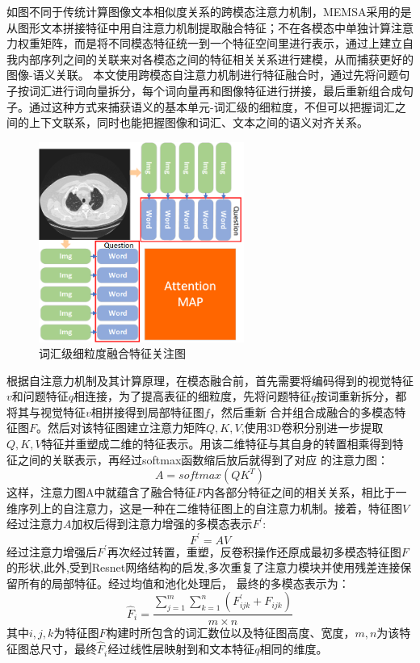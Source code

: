 如图不同于传统计算图像文本相似度关系的跨模态注意力机制，MEMSA采用的是从图形文本拼接特征中用自注意力机制提取融合特征；不在各模态中单独计算注意力权重矩阵，而是将不同模态特征统一到一个特征空间里进行表示，通过上建立自我内部序列之间的关联来对各模态之间的特征相关关系进行建模，从而捕获更好的图像-语义关联。
本文使用跨模态自注意力机制进行特征融合时，通过先将问题句子按词汇进行词向量拆分，每个词向量再和图像特征进行拼接，最后重新组合成句子。通过这种方式来捕获语义的基本单元-词汇级的细粒度，不但可以把握词汇之间的上下文联系，同时也能把握图像和词汇、文本之间的语义对齐关系。
\begin{figure}[htbp]
	\centering	
	\includegraphics[width=0.6\textwidth]{Fig/myfig/chapter3/attention_map.png}  %
	\caption{\label{attention_map}词汇级细粒度融合特征关注图} 
\end{figure}

根据自注意力机制及其计算原理，在模态融合前，首先需要将编码得到的视觉特征$v$和问题特征$q$相连接，为了提高表征的细粒度，先将问题特征$q$按词重新拆分，都将其与视觉特征$v$相拼接得到局部特征图$f$，然后重新
合并组合成融合的多模态特征图$F$。然后对该特征图建立注意力矩阵$Q,K,V$,使用3D卷积分别进一步提取$Q,K,V$特征并重塑成二维的特征表示。用该二维特征与其自身的转置相乘得到特征之间的关联表示，再经过softmax函数缩后放后就得到了对应
的注意力图：
\begin{equation}
	\label{}
	A = softmax(QK^{T})
\end{equation}
这样，注意力图A中就蕴含了融合特征$F$内各部分特征之间的相关关系，相比于一维序列上的自注意力，这是一种在二维特征图上的自注意力机制。接着，特征图$V$经过注意力$A$加权后得到注意力增强的多模态表示$F^{\prime}$:
\begin{equation}
	\label{}
	F^{\prime} = A V
\end{equation}
经过注意力增强后$F^{\prime}$再次经过转置，重塑，反卷积操作还原成最初多模态特征图$F$的形状,此外,受到Resnet网络结构的启发,多次重复了注意力模块并使用残差连接保留所有的局部特征。经过均值和池化处理后，
最终的多模态表示为：
\begin{equation}
	\label{}
	\hat{F}_i=\frac{\sum_{j=1}^m \sum_{k=1}^n\left(F_{i j k}^{\prime}+F_{i j k}\right)}{m \times n}
\end{equation}
其中$i,j,k$为特征图$F$构建时所包含的词汇数位以及特征图高度、宽度，$m,n$为该特征图总尺寸，最终$\hat{F}_i$经过线性层映射到和文本特征$q$相同的维度。

